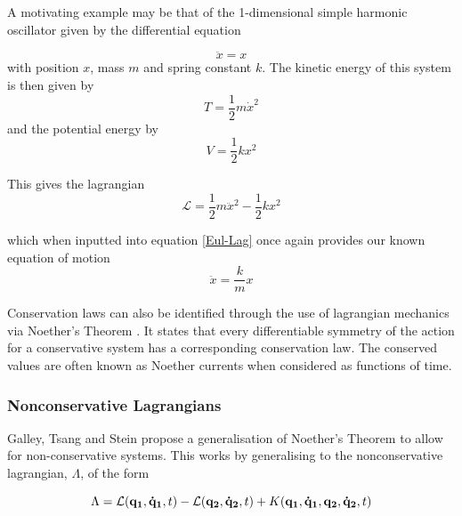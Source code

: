 \documentclass[10pt]{iopart}
\begin{document}
A motivating example may be that of the 1-dimensional simple harmonic oscillator given by the differential equation

\begin{equation}
	\ddot x = x
\end{equation}
with position $x$, mass $m$ and spring constant $k$. The kinetic energy of this system is then given by
\begin{equation}
	T = \frac{1}{2}m\dot x^2
\end{equation}
and the potential energy by 
\begin{equation}
	V = \frac{1}{2}kx^2
\end{equation}

\noindent This gives the lagrangian
\begin{equation}
	\mathcal{L} = \frac{1}{2}m\ddot x^2 - \frac{1}{2}kx^2
\end{equation}

\noindent which when inputted into equation \ref{Eul-Lag} once again provides our known equation of motion
\begin{equation}
	\ddot x = \frac{k}{m}x
\end{equation}

Conservation laws can also be identified through the use of lagrangian mechanics via Noether's Theorem \cite{Goldstein}. It states that every differentiable symmetry of the action for a conservative system has a corresponding conservation law. The conserved values are often known as Noether currents when considered as functions of time. 

\subsubsection{Nonconservative Lagrangians \\}
Galley, Tsang and Stein \cite{GalleyEtAl} propose a generalisation of Noether's Theorem to allow for non-conservative systems. This works by generalising to the nonconservative lagrangian, $\Lambda$, of the form 

\begin{equation}
\label{non-con-lagran}
	\Lambda = \mathcal{L}(\bold{q_1,\dot q_1},t) - \mathcal{L}(\bold{q_2,\dot q_2},t) + K(\bold{q_1,\dot q_1,q_2,\dot q_2},t)
\end{equation}
\end{document}
